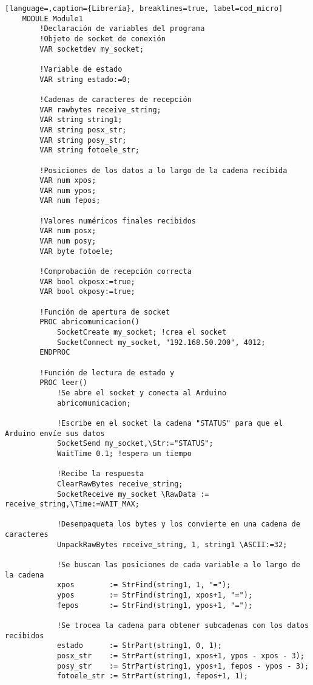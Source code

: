 \begin{lstlisting}[language=,caption={Librería}, breaklines=true, label=cod_micro]
    MODULE Module1  
        !Declaración de variables del programa
        !Objeto de socket de conexión
        VAR socketdev my_socket;
    
        !Variable de estado
        VAR string estado:=0;
    
        !Cadenas de caracteres de recepción
        VAR rawbytes receive_string;
        VAR string string1;
        VAR string posx_str;
        VAR string posy_str;
        VAR string fotoele_str;
    
        !Posiciones de los datos a lo largo de la cadena recibida
        VAR num xpos;
        VAR num ypos;
        VAR num fepos;
        
        !Valores numéricos finales recibidos
        VAR num posx;
        VAR num posy;
        VAR byte fotoele;
        
        !Comprobación de recepción correcta
        VAR bool okposx:=true;
        VAR bool okposy:=true;
            
        !Función de apertura de socket
        PROC abricomunicacion()        
            SocketCreate my_socket; !crea el socket
            SocketConnect my_socket, "192.168.50.200", 4012;        
        ENDPROC
        
        !Función de lectura de estado y 
        PROC leer()
            !Se abre el socket y conecta al Arduino
            abricomunicacion;
            
            !Escribe en el socket la cadena "STATUS" para que el Arduino envíe sus datos
            SocketSend my_socket,\Str:="STATUS"; 
            WaitTime 0.1; !espera un tiempo
    
            !Recibe la respuesta 
            ClearRawBytes receive_string;
            SocketReceive my_socket \RawData := receive_string,\Time:=WAIT_MAX;
            
            !Desempaqueta los bytes y los convierte en una cadena de caracteres
            UnpackRawBytes receive_string, 1, string1 \ASCII:=32;
            
            !Se buscan las posiciones de cada variable a lo largo de la cadena
            xpos        := StrFind(string1, 1, "=");
            ypos        := StrFind(string1, xpos+1, "=");
            fepos       := StrFind(string1, ypos+1, "=");
            
            !Se trocea la cadena para obtener subcadenas con los datos recibidos
            estado      := StrPart(string1, 0, 1);
            posx_str    := StrPart(string1, xpos+1, ypos - xpos - 3);
            posy_str    := StrPart(string1, ypos+1, fepos - ypos - 3);
            fotoele_str := StrPart(string1, fepos+1, 1);
    

\end{lstlisting}
